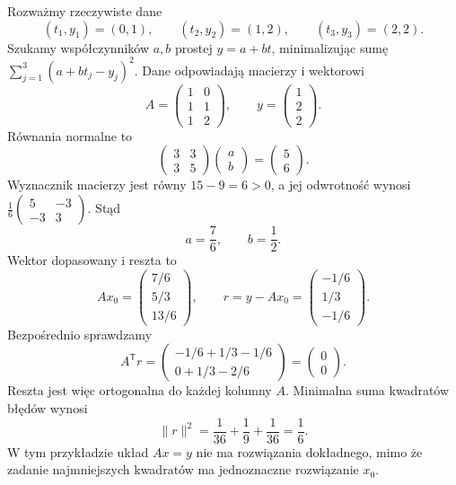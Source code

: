 \begin{przyklad}
\label{prz:lin13-regression}
Rozważmy rzeczywiste dane
\[
 (t_1,y_1)=(0,1),\qquad
 (t_2,y_2)=(1,2),\qquad
 (t_3,y_3)=(2,2).
\]
Szukamy współczynników \(a,b\)
prostej \(y=a+bt\),
minimalizując sumę
\(\sum_{j=1}^3(a+bt_j-y_j)^2\).
Dane odpowiadają macierzy i wektorowi
\[
 A=\begin{pmatrix}
 1&0\\1&1\\1&2
 \end{pmatrix},
 \qquad
 y=\begin{pmatrix}1\\2\\2\end{pmatrix}.
\]
Równania normalne to
\[
 \begin{pmatrix}3&3\\3&5\end{pmatrix}
 \begin{pmatrix}a\\b\end{pmatrix}
 =\begin{pmatrix}5\\6\end{pmatrix}.
\]
Wyznacznik macierzy
jest równy \(15-9=6>0\),
a jej odwrotność wynosi
\(\frac16\begin{pmatrix}5&-3\\-3&3\end{pmatrix}\).
Stąd
\[
 a=\frac76,\qquad b=\frac12.
\]
Wektor dopasowany i reszta to
\[
 Ax_0=
 \begin{pmatrix}7/6\\5/3\\13/6\end{pmatrix},
 \qquad
 r=y-Ax_0=
 \begin{pmatrix}-1/6\\1/3\\-1/6\end{pmatrix}.
\]
Bezpośrednio sprawdzamy
\[
 A^{\mathsf T}r
 =\begin{pmatrix}
 -1/6+1/3-1/6\\
 0+1/3-2/6
 \end{pmatrix}
 =\begin{pmatrix}0\\0\end{pmatrix}.
\]
Reszta jest więc ortogonalna
do każdej kolumny \(A\).
Minimalna suma kwadratów
błędów wynosi
\[
 \|r\|^2
 =\frac1{36}+\frac19+\frac1{36}
 =\frac16.
\]
W tym przykładzie
układ \(Ax=y\) nie ma
rozwiązania dokładnego,
mimo że zadanie najmniejszych
kwadratów ma jednoznaczne
rozwiązanie \(x_0\).
\end{przyklad}

